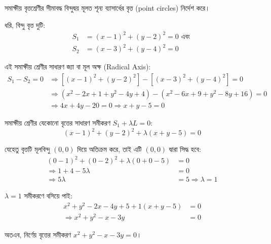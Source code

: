 \documentclass[12pt, a4paper]{article}
\begin{document}
\begin{tcolorbox}[solutionbox={সমাধান (Solution)}]
    \noindent
    সমাক্ষীয় বৃত্তশ্রেণীর সীমাবদ্ধ বিন্দুদ্বয় মূলত শূন্য ব্যাসার্ধের বৃত্ত (point circles) নির্দেশ করে। 
    
    \vspace{0.5em}
    ধরি, বিন্দু বৃত্ত দুটি: 
    \begin{align*}
        S_1 &= (x - 1)^2 + (y - 2)^2 = 0 \text{ এবং } \\
        S_2 &= (x - 3)^2 + (y - 4)^2 = 0
    \end{align*}
    
    \vspace{0.5em}
    এই সমাক্ষীয় শ্রেণীর সাধারণ জ্যা বা মূল অক্ষ (Radical Axis):
    \begin{align*}
        S_1 - S_2 = 0 &\Rightarrow [(x - 1)^2 + (y - 2)^2] - [(x - 3)^2 + (y - 4)^2] = 0 \\
        &\Rightarrow (x^2 - 2x + 1 + y^2 - 4y + 4) - (x^2 - 6x + 9 + y^2 - 8y + 16) = 0 \\
        &\Rightarrow 4x + 4y - 20 = 0 \Rightarrow x + y - 5 = 0
    \end{align*}
    
    \vspace{0.5em}
    সমাক্ষীয় শ্রেণীর যেকোনো বৃত্তের সাধারণ সমীকরণ $S_1 + \lambda L = 0$:
    \[ (x - 1)^2 + (y - 2)^2 + \lambda(x + y - 5) = 0 \]
    
    \vspace{0.5em}
    যেহেতু বৃত্তটি মূলবিন্দু $(0, 0)$ দিয়ে অতিক্রম করে, তাই এটি $(0, 0)$ দ্বারা সিদ্ধ হবে:
    \begin{align*}
        (0 - 1)^2 + (0 - 2)^2 + \lambda(0 + 0 - 5) &= 0 \\
        \Rightarrow 1 + 4 - 5\lambda &= 0 \\
        \Rightarrow 5\lambda &= 5 \Rightarrow \lambda = 1
    \end{align*}
    
    \vspace{0.5em}
    $\lambda = 1$ সমীকরণে বসিয়ে পাই:
    \begin{align*}
        x^2 + y^2 - 2x - 4y + 5 + 1(x + y - 5) &= 0 \\
        \Rightarrow x^2 + y^2 - x - 3y &= 0
    \end{align*}
    
    \vspace{0.5em}
    অতএব, নির্ণেয় বৃত্তের সমীকরণ $x^2 + y^2 - x - 3y = 0$।
\end{tcolorbox}
\end{document}
